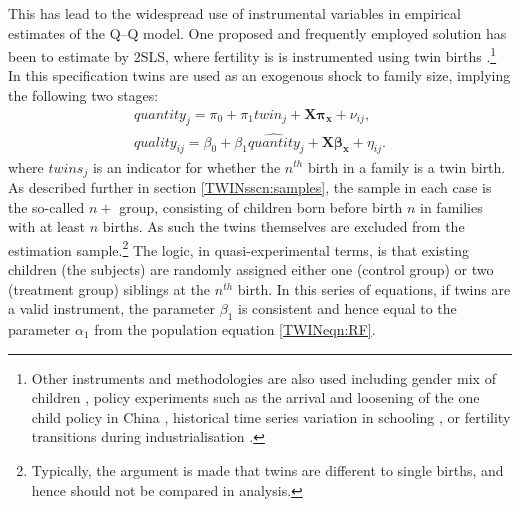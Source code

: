 \documentclass[subeqn]{article}
\begin{document}
\begin{spacing}{1.4}
This has lead to the widespread use of instrumental variables in empirical
estimates of the Q--Q model.  One proposed and frequently employed solution has
been to estimate by 2SLS, where fertility is is instrumented using twin
births \citep{RosenzweigWolpin1980}.\footnote{Other instruments and methodologies
  are also used including gender mix of children \citep{ConleyGlauber2006}, policy
  experiments such as the arrival and loosening of the one child policy in China
  \citep{Qian2009,ArgysAverett2015}, historical time series variation in schooling
  \citep{BleakleyLange2009}, or fertility transitions during industrialisation
  \citep{DalgaardStrulik2015}.}  In this specification twins are used as an
exogenous shock to family size, implying the following two stages:
\begin{subequations}
  \begin{eqnarray}
    \label{TWINeqn:IV1}
    quantity_{j}=\pi_0+\pi_1 twin_{j} + \bm{X}\bm{\pi_x}+\nu_{ij}, \\ \label{TWINeqn:IV2}
    quality_{ij}=\beta_0 + \beta_1 \widehat{quantity}_j + \bm{X}\bm{\beta_x}+\eta_{ij}.
  \end{eqnarray}
\end{subequations}
where $twins_j$ is an indicator for whether the $n^{th}$ birth in a family is a
twin birth. As described further in section \ref{TWINsscn:samples}, the sample
in each case is the so-called $n+$ group, consisting of children born before
birth $n$ in families with at least $n$ births. As such the twins themselves are
excluded from the estimation sample.\footnote{Typically, the argument is made
  that twins are different to single births, and hence should not be compared in
  analysis.} The logic, in quasi-experimental terms, is that existing children
(the subjects) are randomly assigned either one (control group) or two
(treatment group) siblings at the $n^{th}$ birth.  In this series of equations,
if twins are a valid instrument, the parameter $\beta_1$ is consistent and hence
equal to the parameter $\alpha_1$ from the population equation \ref{TWINeqn:RF}.


\end{spacing}
\end{document}
